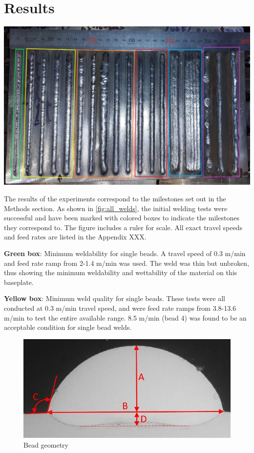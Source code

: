 \section{Results}

\begin{minipage}{\linewidth}
    \centering
    \includegraphics[width=\linewidth]{images/all_welds_boxes.jpg}
    \label{fig:all_welds}
\end{minipage}

The results of the experiments correspond to the milestones set out in the Methods section. As shown in \autoref{fig:all_welds}, the initial welding tests were successful and have been marked with colored boxes to indicate the milestones they correspond to. The figure includes a ruler for scale. All exact travel speeds and feed rates are listed in the Appendix XXX.

\textbf{Green box}: Minimum weldability for single beads. A travel speed of 0.3 m/min and feed rate ramp from 2-1.4 m/min was used. The weld was thin but unbroken, thus showing the minimum weldability and wettability of the material on this baseplate.

\textbf{Yellow box}: Minimum weld quality for single beads. These tests were all conducted at 0.3 m/min travel speed, and were feed rate ramps from 3.8-13.6 m/min to test the entire available range. 8.5 m/min (bead 4) was found to be an acceptable condition for single bead welds.

\begin{figure}[H]
    \centering
    \includegraphics[width=\linewidth]{images/bead_geometry.png}
    \caption{Bead geometry \cite{Dinovitzer_Chen_Laliberte_Huang_Frei_2019}}
    \label{fig:bead_geometry}
\end{figure}

